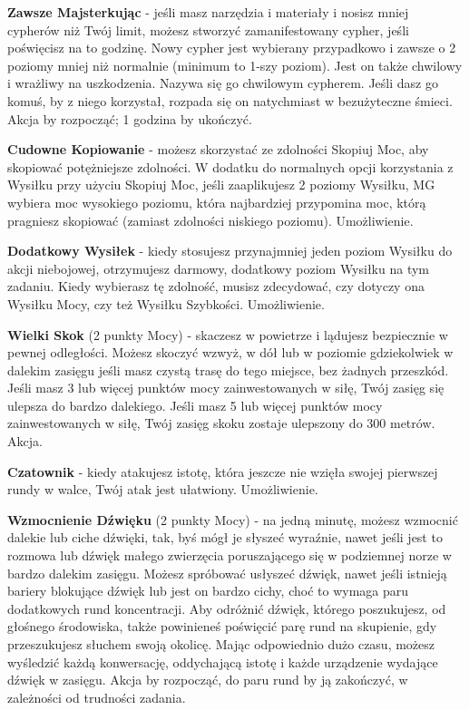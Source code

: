 \textbf{Zawsze Majsterkując}\label{sec:Zawsze Majsterkując} - jeśli masz narzędzia i materiały i nosisz mniej cypherów niż Twój limit, możesz stworzyć zamanifestowany cypher, jeśli poświęcisz na to godzinę. Nowy cypher jest wybierany przypadkowo i zawsze o 2 poziomy mniej niż normalnie (minimum to 1-szy poziom). Jest on także chwilowy i wrażliwy na uszkodzenia. Nazywa się go chwilowym cypherem. Jeśli dasz go komuś, by z niego korzystał, rozpada się on natychmiast w bezużyteczne śmieci. Akcja by rozpocząć; 1 godzina by ukończyć.

\textbf{Cudowne Kopiowanie}\label{sec:Cudowne Kopiowanie} - możesz skorzystać ze zdolności Skopiuj Moc, aby skopiować potężniejsze zdolności. W dodatku do normalnych opcji korzystania z Wysiłku przy użyciu Skopiuj Moc, jeśli zaaplikujesz 2 poziomy Wysiłku, MG wybiera moc wysokiego poziomu, która najbardziej przypomina moc, którą pragniesz skopiować (zamiast zdolności niskiego poziomu). Umożliwienie.

\textbf{Dodatkowy Wysiłek}\label{sec:Dodatkowy Wysiłek} - kiedy stosujesz przynajmniej jeden poziom Wysiłku do akcji niebojowej, otrzymujesz darmowy, dodatkowy poziom Wysiłku na tym zadaniu. Kiedy wybierasz tę zdolność, musisz zdecydować, czy dotyczy ona Wysiłku Mocy, czy też Wysiłku Szybkości. Umożliwienie.

\textbf{Wielki Skok}\label{sec:Wielki Skok} (2 punkty Mocy) - skaczesz w powietrze i lądujesz bezpiecznie w pewnej odległości. Możesz skoczyć wzwyż, w dół lub w poziomie gdziekolwiek w dalekim zasięgu  jeśli masz czystą trasę do tego miejsce, bez żadnych przeszkód. Jeśli masz 3 lub więcej punktów mocy zainwestowanych w siłę, Twój zasięg się ulepsza do bardzo dalekiego. Jeśli masz 5 lub więcej punktów mocy zainwestowanych w siłę, Twój zasięg skoku zostaje ulepszony do 300 metrów. Akcja.

\textbf{Czatownik}\label{sec:Czatownik} - kiedy atakujesz istotę, która jeszcze nie wzięła swojej pierwszej rundy w walce, Twój atak jest ułatwiony. Umożliwienie.

\textbf{Wzmocnienie Dźwięku}\label{sec:Wzmocnienie Dźwięku} (2 punkty Mocy) - na jedną minutę, możesz wzmocnić dalekie lub ciche dźwięki, tak, byś mógł je słyszeć wyraźnie, nawet jeśli jest to rozmowa lub dźwięk małego zwierzęcia poruszającego się w podziemnej norze w bardzo dalekim zasięgu. Możesz spróbować usłyszeć dźwięk, nawet jeśli istnieją bariery blokujące dźwięk lub jest on bardzo cichy, choć to wymaga paru dodatkowych rund koncentracji. Aby odróżnić dźwięk, którego poszukujesz, od głośnego środowiska, także powinieneś poświęcić parę rund na skupienie, gdy przeszukujesz słuchem swoją okolicę. Mając odpowiednio dużo czasu, możesz wyśledzić każdą konwersację, oddychającą istotę i każde urządzenie wydające dźwięk w zasięgu. Akcja by rozpocząć, do paru rund by ją zakończyć, w zależności od trudności zadania.

